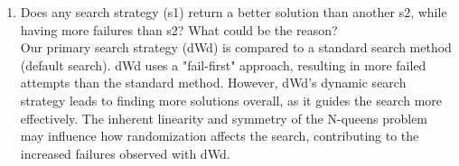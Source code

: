 \documentclass{article}
\begin{document}
\begin{enumerate}
    \item Does any search strategy (s1) return a better solution than another s2, while having more failures than s2? What could be the reason? \\
    Our primary search strategy (dWd) is compared to a standard search method (default search). dWd uses a "fail-first" approach, resulting in more failed attempts than the standard method. However, dWd's dynamic search strategy leads to finding more solutions overall, as it guides the search more effectively. The inherent linearity and symmetry of the N-queens problem may influence how randomization affects the search, contributing to the increased failures observed with dWd.
\end{enumerate}
\end{document}
